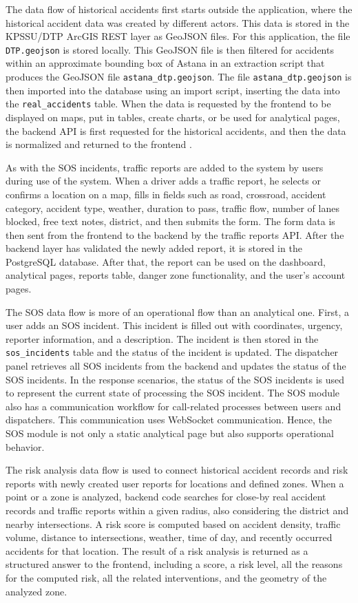 ﻿\documentclass[12pt,a4paper]{report}
\begin{document}
The data flow of historical accidents first starts outside the application, where the historical accident data was created by different actors. This data is stored in the KPSSU/DTP ArcGIS REST layer as GeoJSON files. For this application, the file \texttt{DTP.geojson} is stored locally. This GeoJSON file is then filtered for accidents within an approximate bounding box of Astana in an extraction script that produces the GeoJSON file \texttt{astana\_dtp.geojson}. The file \texttt{astana\_dtp.geojson} is then imported into the database using an import script, inserting the data into the \texttt{real\_accidents} table. When the data is requested by the frontend to be displayed on maps, put in tables, create charts, or be used for analytical pages, the backend API is first requested for the historical accidents, and then the data is normalized and returned to the frontend \cite{kpssuDtp}.

As with the SOS incidents, traffic reports are added to the system by users during use of the system. When a driver adds a traffic report, he selects or confirms a location on a map, fills in fields such as road, crossroad, accident category, accident type, weather, duration to pass, traffic flow, number of lanes blocked, free text notes, district, and then submits the form. The form data is then sent from the frontend to the backend by the traffic reports API. After the backend layer has validated the newly added report, it is stored in the PostgreSQL database. After that, the report can be used on the dashboard, analytical pages, reports table, danger zone functionality, and the user's account pages.

The SOS data flow is more of an operational flow than an analytical one. First, a user adds an SOS incident. This incident is filled out with coordinates, urgency, reporter information, and a description. The incident is then stored in the \texttt{sos\_incidents} table and the status of the incident is updated. The dispatcher panel retrieves all SOS incidents from the backend and updates the status of the SOS incidents. In the response scenarios, the status of the SOS incidents is used to represent the current state of processing the SOS incident. The SOS module also has a communication workflow for call-related processes between users and dispatchers. This communication uses WebSocket communication. Hence, the SOS module is not only a static analytical page but also supports operational behavior.

The risk analysis data flow is used to connect historical accident records and risk reports with newly created user reports for locations and defined zones. When a point or a zone is analyzed, backend code searches for close-by real accident records and traffic reports within a given radius, also considering the district and nearby intersections. A risk score is computed based on accident density, traffic volume, distance to intersections, weather, time of day, and recently occurred accidents for that location. The result of a risk analysis is returned as a structured answer to the frontend, including a score, a risk level, all the reasons for the computed risk, all the related interventions, and the geometry of the analyzed zone.
\end{document}

